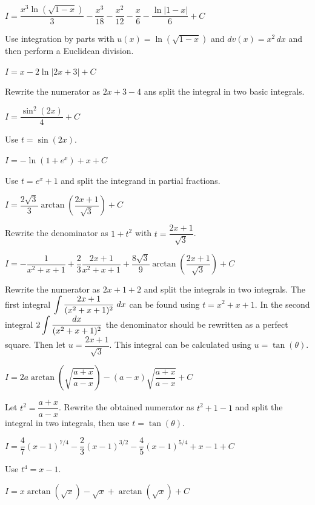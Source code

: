 \begin{Answer}

    	\Question $I = \dfrac{x^3 \ln\left(\sqrt{1-x}\right)}{3}-\dfrac{x^3}{18}-\dfrac{x^2}{12}-\dfrac{x}{6}-\dfrac{\ln|1-x|}{6}+C $
    	
    	Use integration by parts with $u(x)=\ln(\sqrt{1-x})$ and $dv(x)= x^2\, dx$ and then perform a Euclidean division.
    		
    	\Question $I = x - 2 \ln |2x+3| + C$
    	
    	Rewrite the numerator as $2x+3-4$ ans split the integral in two basic integrals.
    		
    	\Question $I = \dfrac{\sin^2 (2x)}{4} + C$
    
        Use $t = \sin (2x)$.
    		
    	\Question $I = - \ln(1+e^{x})+ x + C$
    	
    	Use $t = e^x + 1$ and split the integrand in partial fractions.
    		
    	\Question $I = \dfrac{2\sqrt{3}}{3} \arctan \left(\dfrac{2x+1}{\sqrt{3}}\right) + C$
    	
    	Rewrite the denominator as $1+t^2$ with $t = \dfrac{2x+1}{\sqrt{3}}$. 
    		
    	\Question $I = -\dfrac{1}{x^2+x+1}+\dfrac{2}{3} \dfrac{2x+1}{x^2+x+1} + \dfrac{8\sqrt{3}}{9} \arctan \left(\dfrac{2x+1}{\sqrt{3}}\right)+C$
    
        Rewrite the numerator as $2x + 1 + 2$ and split the integrals in two  integrals. The first integral $\displaystyle \int\dfrac{2x+1}{(x^2+x+1)^2}\;dx$ can be found using $t = x^2+x+1$. In the second integral $2 \displaystyle \int\dfrac{dx}{(x^2+x+1)^2}$ the denominator should be rewritten as a perfect square. Then let $u = \dfrac{2x+1}{\sqrt{3}}$. This integral can be calculated using $u = \tan (\theta)$.
    		
    	\Question $I = 2a\arctan \left(\sqrt{\dfrac{a+x}{a-x}}\right) - (a-x) \sqrt{\dfrac{a+x}{a-x}} + C$
    	
    	Let $t^2= {\dfrac{a+x}{a-x}}$. Rewrite the obtained numerator as $t^2+1-1$ and split the integral in two integrals, then use $t = \tan (\theta)$.
    		
    	\Question $I =  \dfrac{4}{7} (x-1)^{7/4}-\dfrac{2}{3} (x-1)^{3/2} - \dfrac{4}{5} (x-1)^{5/4}+x-1+C$
    	
    	Use $t^4 = x-1$.
    		
    	\Question $I = x \arctan (\sqrt{x}) -\sqrt{x} + \arctan (\sqrt{x}) +C$
    	

\end{Answer}
